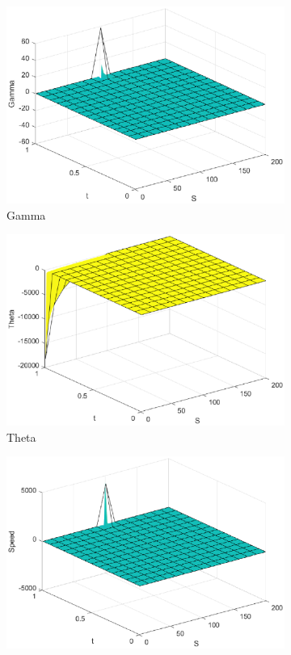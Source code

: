 \begin{figure}[H]
\begin{subfigure}[b]{0.35\linewidth}
        \includegraphics[width=\linewidth]{Imagenes/Parte1/6_Sols/Binary_Put/Binary_Put_Gamma.eps}
        \caption{Gamma}
    \end{subfigure}
    \begin{subfigure}[b]{0.35\linewidth}
        \includegraphics[width=\linewidth]{Imagenes/Parte1/6_Sols/Binary_Put/Binary_Put_Theta.eps}
        \caption{Theta}
    \end{subfigure}
    \begin{subfigure}[b]{0.35\linewidth}
        \includegraphics[width=\linewidth]{Imagenes/Parte1/6_Sols/Binary_Put/Binary_Put_Speed.eps}

\end{subfigure}
\end{figure}
